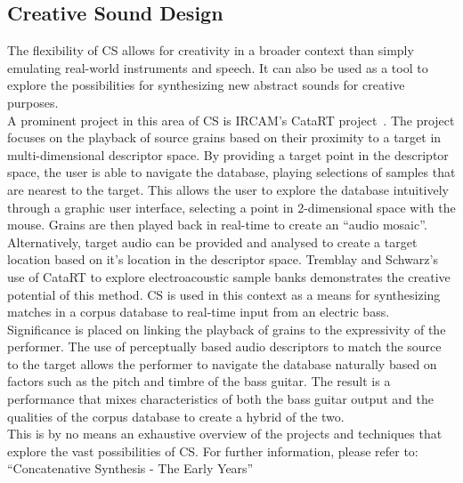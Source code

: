 \documentclass{scrartcl}
\begin{document}
    \subsection*{Creative Sound Design}
    The flexibility of CS allows for creativity in a broader context than simply
    emulating real-world instruments and speech. It can also be used as a tool
    to explore the possibilities for synthesizing new abstract sounds for
    creative purposes.\\
    A prominent project in this area of CS is IRCAM's CataRT
    project~\parencite{Schwarz2006a}. The project focuses on the playback of
    source grains based on their proximity to a target in multi-dimensional
    descriptor space.  By providing a target point in the descriptor space, the
    user is able to navigate the database, playing selections of samples that
    are nearest to the target. This allows the user to explore the database
    intuitively through a graphic user interface, selecting a point in
    2-dimensional space with the mouse. Grains are then played back in
    real-time to create an ``audio mosaic''.\\
    Alternatively, target audio can be provided and analysed to create a target
    location based on it's location in the descriptor space.  Tremblay and
    Schwarz's~\citeyearpar{Tremblay2010} use of CataRT to explore
    electroacoustic sample banks demonstrates the creative potential of this
    method. CS is used in this context as a means for synthesizing matches in a
    corpus database to real-time input from an electric bass.  Significance is
    placed on linking the playback of grains to the expressivity of the
    performer. The use of perceptually based audio descriptors to match the
    source to the target allows the performer to navigate the database
    naturally based on factors such as the pitch and timbre of the bass
    guitar. The result is a performance that mixes characteristics of both the
    bass guitar output and the qualities of the corpus database to create a
    hybrid of the two.\\

    This is by no means an exhaustive overview of the projects and techniques
    that explore the vast possibilities of CS. For further information, please
    refer to: ``Concatenative Synthesis - The Early
    Years''~\parencite{Schwarz2006b}
\end{document}
